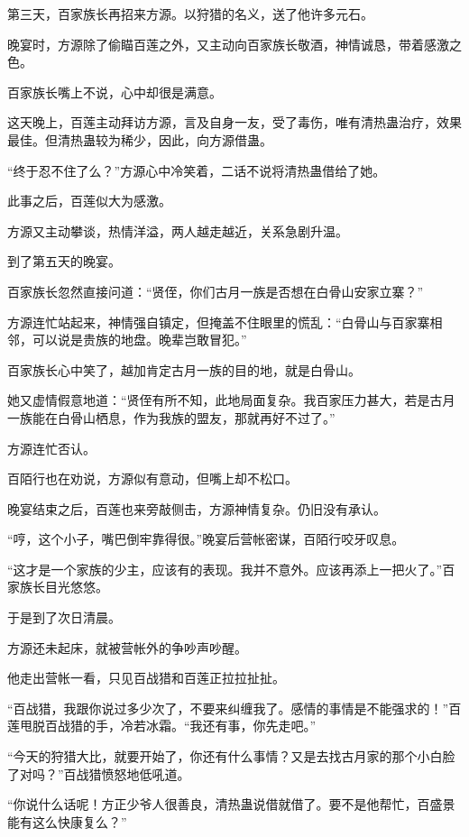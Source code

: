 
\begin{this_body}

第三天，百家族长再招来方源。以狩猎的名义，送了他许多元石。

晚宴时，方源除了偷瞄百莲之外，又主动向百家族长敬酒，神情诚恳，带着感激之色。

百家族长嘴上不说，心中却很是满意。

这天晚上，百莲主动拜访方源，言及自身一友，受了毒伤，唯有清热蛊治疗，效果最佳。但清热蛊较为稀少，因此，向方源借蛊。

“终于忍不住了么？”方源心中冷笑着，二话不说将清热蛊借给了她。

此事之后，百莲似大为感激。

方源又主动攀谈，热情洋溢，两人越走越近，关系急剧升温。

到了第五天的晚宴。

百家族长忽然直接问道：“贤侄，你们古月一族是否想在白骨山安家立寨？”

方源连忙站起来，神情强自镇定，但掩盖不住眼里的慌乱：“白骨山与百家寨相邻，可以说是贵族的地盘。晚辈岂敢冒犯。”

百家族长心中笑了，越加肯定古月一族的目的地，就是白骨山。

她又虚情假意地道：“贤侄有所不知，此地局面复杂。我百家压力甚大，若是古月一族能在白骨山栖息，作为我族的盟友，那就再好不过了。”

方源连忙否认。

百陌行也在劝说，方源似有意动，但嘴上却不松口。

晚宴结束之后，百莲也来旁敲侧击，方源神情复杂。仍旧没有承认。

“哼，这个小子，嘴巴倒牢靠得很。”晚宴后营帐密谋，百陌行咬牙叹息。

“这才是一个家族的少主，应该有的表现。我并不意外。应该再添上一把火了。”百家族长目光悠悠。

于是到了次日清晨。

方源还未起床，就被营帐外的争吵声吵醒。

他走出营帐一看，只见百战猎和百莲正拉拉扯扯。

“百战猎，我跟你说过多少次了，不要来纠缠我了。感情的事情是不能强求的！”百莲甩脱百战猎的手，冷若冰霜。“我还有事，你先走吧。”

“今天的狩猎大比，就要开始了，你还有什么事情？又是去找古月家的那个小白脸了对吗？”百战猎愤怒地低吼道。

“你说什么话呢！方正少爷人很善良，清热蛊说借就借了。要不是他帮忙，百盛景能有这么快康复么？”


\end{this_body}
